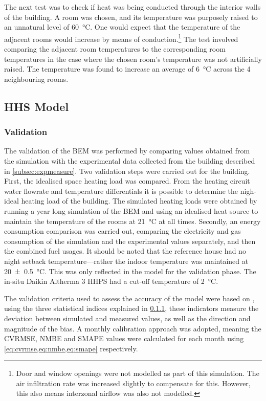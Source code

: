 The next test was to check if heat was being conducted through the interior walls of the building. A room was chosen, and its temperature was purposely raised to an unnatural level of \qty{60}{\celsius}. One would expect that the temperature of the adjacent rooms would increase by means of conduction.\footnote{Door and window openings were not modelled as part of this simulation. The air infiltration rate was increased slightly to compensate for this. However, this also means interzonal airflow was also not modelled.} The test involved comparing the adjacent room temperatures to the corresponding room temperatures in the case where the chosen room's temperature was not artificially raised. The temperature was found to increase an average of \qty{6}{\celsius} across the 4 neighbouring rooms. 
\subsection{HHS Model}\label{sec:methodheatingsys}
\subsubsection{Validation} \label{subsubsec:validation}
The validation of the \ac{BEM} was performed by comparing values obtained from the simulation with the experimental data collected from the building described in \cref{subsec:expmeasure}. Two validation steps were carried out for the building. First, the idealised space heating load was compared. From the heating circuit water flowrate and temperature differentials it is possible to determine the nigh-ideal heating load of the building. The simulated heating loads were obtained by running a year long simulation of the \ac{BEM} and using an idealised heat source to maintain the temperature of the rooms at \qty{21}{\celsius} at all times. Secondly, an energy consumption comparison was carried out, comparing the electricity and gas consumption of the simulation and the experimental values separately, and then the combined fuel usages. It should be noted that the reference house had no night setback temperature---rather the indoor temperature was maintained at \SI[separate-uncertainty = true]{20(0.5)}{\celsius}. This was only reflected in the \modelica model for the validation phase. The in-situ Daikin Altherma 3 \ac{HHPS} had a cut-off temperature of \qty{2}{\celsius}.

The validation criteria used to assess the accuracy of the model were based on   \cite{ashrae_guideline_project_committee_14_ashrae_2014}, using the three statistical indices explained in \cref{subsubsec:validation}, these indicators measure the deviation between simulated and measured values, as well as the direction and magnitude of the bias. A monthly calibration approach was adopted, meaning the \ac{CVRMSE}, \ac{NMBE} and \ac{SMAPE} values were calculated for each month using \cref{eq:cvrmse,eq:nmbe,eq:smape} respectively. 

